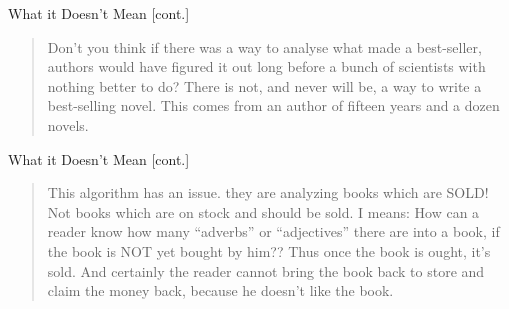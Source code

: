 \documentclass[professionalfonts, xcolor={usenames,svgnames,x11names,table}]{beamer}
\begin{document}
\begin{frame}{What it Doesn't Mean [cont.]}
    \begin{quote}
    Don't you think if there was a way to analyse what made a best-seller, authors would have figured it out long before a bunch of scientists with nothing better to do? There is not, and never will be, a way to write a best-selling novel. This comes from an author of fifteen years and a dozen novels.
    \end{quote}

\end{frame}

\begin{frame}{What it Doesn't Mean [cont.]}
    \begin{quote}
        This algorithm has an issue. 
        they are analyzing books which are SOLD!
        Not books which are on stock and should be sold.
        I means: How can a reader know how many ``adverbs'' or ``adjectives'' there are into a book, if the book is NOT yet bought by him??
        Thus once the book is ought, it's sold. And certainly the reader cannot bring the book back to store and claim the money back, because he doesn't like the book.
    \end{quote}

\end{frame}
\end{document}
